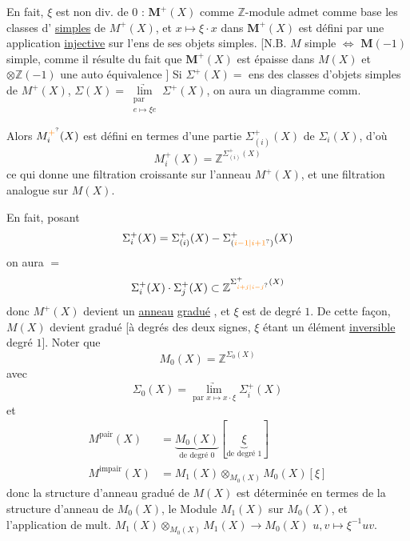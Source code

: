 En fait, $\xi$ est non div. de $0$ : $\mathbf M^+(X)$ comme $\mathbb Z$-module admet comme base les classes d' \uline{simples} de $M^+(X)$, et $x\mapsto\xi\cdot x$ dans $\mathbf M^+(X)$ est défini par une application \uline{injective} sur l'ens de ses objets simples. [N.B. $M$ simple  $\Longleftrightarrow$  $\mathbf M(-1)$ simple, comme il résulte du fait que $\mathbf M^+(X)$ est épaisse dans $M(X)$ et $\otimes\mathbb Z(-1)$ une auto équivalence ]
Si $\Sigma^+(X)=$ ens des classes d'objets simples de $M^+(X)$, $\Sigma(X)=\underset{\substack{\text{par}\\e\mapsto\xi e}}{\underrightarrow{\lim}}\Sigma^+(X)$, on aura   un diagramme comm.

Alors $M_i^{\unsure{+}}(X)$ est défini en termes d'une partie $\Sigma^+_{(i)}(X)$ de $\Sigma_i(X)$, d'où
\[
M^+_i(X)=\mathbb Z^{\Sigma^+_{(i)}(X)}
\]
ce qui donne une filtration croissante sur l'anneau $M^+(X)$, et une filtration analogue sur $M(X)$.

En fait, posant
\[
\Sigma_i^+(X)=\Sigma^+_{(i)}(X)-\Sigma^+_{(\unsure{i-1|i+1})}(X)
\]
on aura $=$
\[
\Sigma_i^+(X)\cdot\Sigma_j^+(X)\subset\mathbb Z^{\Sigma^+_{\unsure{i+j|i-j}}(X)}
\]
donc $M^+(X)$ devient un \uline{anneau}
\uline{gradué} , et $\xi$ est de degré $1$. De cette façon, $M(X)$ devient gradué [à degrés des deux signes, $\xi$ étant un élément \uline{inversible}  degré $1$]. Noter que
\[
M_0(X)=\mathbb Z^{\Sigma_0(X)}
\]
avec
\[
\Sigma_0(X)=\underset{\text{par }x\mapsto x\cdot\xi}{\underrightarrow{\lim}}\Sigma_i^+(X)
\]
et
\[
\begin{aligned}
M^{\mathrm{pair}}(X)&=\underbrace{M_0(X)}_{\text{de degré }0}[\underbrace{\xi}_{\text{de degré }1}]\\
M^{\mathrm{impair}}(X)&=M_1(X)\otimes_{M_0(X)}M_0(X)[\xi]
\end{aligned}
\]
donc la structure d'anneau gradué de $M(X)$ est déterminée en termes de la structure d'anneau de $M_0(X)$,  le Module $M_1(X)$ sur $M_0(X)$, et l'application de mult.
$M_1(X)\otimes_{M_{0}(X)}M_1(X)\longrightarrow M_0(X)$  \deleted{\unsure{$\xi$}} $u,v\mapsto\xi^{-1}uv$.

